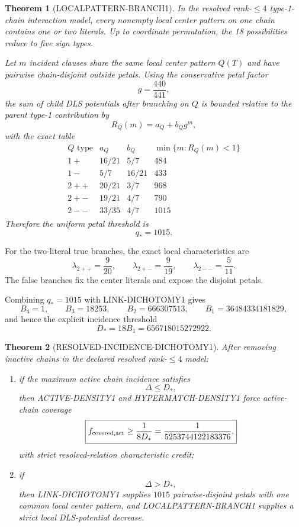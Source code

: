 \documentclass[11pt]{article}
\theoremstyle{plain}
\newtheorem{theorem}{Theorem}[section]
\theoremstyle{definition}
\theoremstyle{remark}
\begin{document}
\begin{theorem}[LOCALPATTERN-BRANCH1]
In the resolved rank-$\le4$ type-1-chain interaction model, every nonempty
local center pattern on one chain contains one or two literals.  Up to
coordinate permutation, the 18 possibilities reduce to five sign types.

Let $m$ incident clauses share the same local center pattern $Q(T)$ and have
pairwise chain-disjoint outside petals.  Using the conservative petal factor
\[
g=\frac{440}{441},
\]
the sum of child DLS potentials after branching on $Q$ is bounded relative to
the parent type-1 contribution by
\[
R_Q(m)=a_Q+b_Qg^m,
\]
with the exact table
\[
\begin{array}{c|c|c|c}
Q\text{ type} & a_Q & b_Q &
\min\{m:R_Q(m)<1\}\\
\hline
1+ & 16/21 & 5/7 & 484\\
1- & 5/7 & 16/21 & 433\\
2++ & 20/21 & 3/7 & 968\\
2+- & 19/21 & 4/7 & 790\\
2-- & 33/35 & 4/7 & 1015
\end{array}
\]
Therefore the uniform petal threshold is
\[
\boxed{q_*=1015.}
\]
\end{theorem}

For the two-literal true branches, the exact local characteristics are
\[
\lambda_{2++}=\frac9{20},\qquad
\lambda_{2+-}=\frac9{19},\qquad
\lambda_{2--}=\frac5{11}.
\]
The false branches fix the center literals and expose the disjoint petals.

Combining $q_*=1015$ with LINK-DICHOTOMY1 gives
\[
B_4=1,\qquad
B_3=18253,\qquad
B_2=666307513,\qquad
B_1=36484334181829,
\]
and hence the explicit incidence threshold
\[
\boxed{
D_*=18B_1=656718015272922.
}
\]

\begin{theorem}[RESOLVED-INCIDENCE-DICHOTOMY1]
After removing inactive chains in the declared resolved rank-$\le4$ model:

\begin{enumerate}[leftmargin=1.6em]
\item if the maximum active chain incidence satisfies
\[
\Delta\le D_*,
\]
then ACTIVE-DENSITY1 and HYPERMATCH-DENSITY1 force active-chain coverage
\[
\boxed{
f_{\rm covered,act}
\ge
\frac1{8D_*}
=
\frac1{5253744122183376},
}
\]
with strict resolved-relation characteristic credit;

\item if
\[
\Delta>D_*,
\]
then LINK-DICHOTOMY1 supplies $1015$ pairwise-disjoint petals with one common
local center pattern, and LOCALPATTERN-BRANCH1 supplies a strict local
DLS-potential decrease.
\end{enumerate}
\end{theorem}
\end{document}
